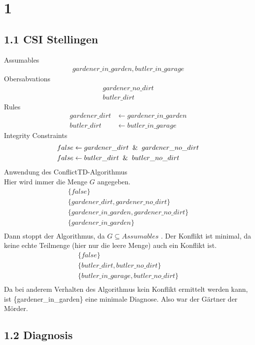 \documentclass[a4paper,11pt,fleqn]{scrartcl}
\title{\titleinfo}
\author{\authorinfo}
\begin{document}
\maketitle
\notag

\section*{1}
\subsection*{1.1 CSI Stellingen}

Assumables 
\begin{align*}
gardener\_in\_garden, butler\_in\_garage
\end{align*}
Obersabvations
\begin{align*}
 gardener\_no\_dirt\\
 butler\_dirt
\end{align*}
Rules
\begin{align*}
 gardener\_dirt &\gets gardener\_in\_garden\\
 butler\_dirt &\gets butler\_in\_garage 
\end{align*}
Integrity Constraints
 \begin{align*}
  false &\gets gardener\_dirt \And gardener\_no\_dirt\\
  false &\gets butler\_dirt \And butler\_no\_dirt 
 \end{align*}
Anwendung des ConflictTD-Algorithmus\\
Hier wird immer die Menge $G$ angegeben.\\ 
\begin{align*}
\{false\}\\ %
\{gardener\_dirt, gardener\_no\_dirt\}\\ %
\{gardener\_in\_garden, gardener\_no\_dirt\}\\ %
\{gardener\_in\_garden\}\\
\end{align*}
Dann stoppt der Algorithmus, da $G \subseteq Assumables$ . 
Der Konflikt ist minimal, da keine echte Teilmenge (hier nur die leere Menge) auch ein Konflikt ist.\\
\begin{align*}
\{false\}\\
\{butler\_dirt, butler\_no\_dirt\}\\
\{butler\_in\_garage,butler\_no\_dirt\}\\
\end{align*}
Da bei anderem Verhalten des Algorithmus kein Konflikt ermittelt werden kann, ist \{gardener\_in\_garden\} eine minimale Diagnose.
Also war der Gärtner der Mörder.
\subsection*{1.2 Diagnosis}
\end{document}
